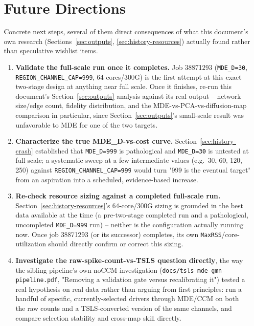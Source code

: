 \documentclass[11pt]{article}
\begin{document}
\newpage
\section{Future Directions}
\label{sec:future}
Concrete next steps, several of them direct consequences of what this document's own research (Sections~\ref{sec:outputs}, \ref{sec:history-resources}) actually found rather than speculative wishlist items.

\begin{enumerate}[leftmargin=1.4em]
  \item \textbf{Validate the full-scale run once it completes.} Job 38871293 (\texttt{MDE\_D=30}, \texttt{REGION\_CHANNEL\_CAP=999}, 64 cores/300G) is the first attempt at this exact two-stage design at anything near full scale. Once it finishes, re-run this document's Section~\ref{sec:outputs} analysis against its real output -- network size/edge count, fidelity distribution, and the MDE-vs-PCA-vs-diffusion-map comparison in particular, since Section~\ref{sec:outputs}'s small-scale result was unfavorable to MDE for one of the two targets.
  \item \textbf{Characterize the true MDE\_D-vs-cost curve.} Section~\ref{sec:history-crash} established that \texttt{MDE\_D=999} is pathological and \texttt{MDE\_D=30} is untested at full scale; a systematic sweep at a few intermediate values (e.g.\ 30, 60, 120, 250) against \texttt{REGION\_CHANNEL\_CAP=999} would turn "999 is the eventual target" from an aspiration into a scheduled, evidence-based increase.
  \item \textbf{Re-check resource sizing against a completed full-scale run.} Section~\ref{sec:history-resources}'s 64-core/300G sizing is grounded in the best data available at the time (a pre-two-stage completed run and a pathological, uncompleted \texttt{MDE\_D=999} run) -- neither is the configuration actually running now. Once job 38871293 (or its successor) completes, its own \texttt{MaxRSS}/core-utilization should directly confirm or correct this sizing.
  \item \textbf{Investigate the raw-spike-count-vs-TSLS question directly}, the way the sibling pipeline's own noCCM investigation (\texttt{docs/tsls-mde-gmn-pipeline.pdf}, "Removing a validation gate versus recalibrating it") tested a real hypothesis on real data rather than arguing from first principles: run a handful of specific, currently-selected drivers through MDE/CCM on both the raw counts and a TSLS-converted version of the same channels, and compare selection stability and cross-map skill directly.

\end{enumerate}
\end{document}
